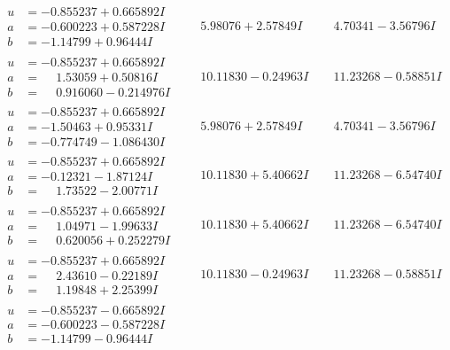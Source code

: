 \documentclass[1p]{elsarticle_modified}
\theoremstyle{definition}
\begin{document}
$$\begin{array}{c|c|c}
\begin{aligned}
u &= -0.855237 + 0.665892 I \\
a &= -0.600223 + 0.587228 I \\
b &= -1.14799 + 0.96444 I\end{aligned}
 & \phantom{-}5.98076 + 2.57849 I & \phantom{-}4.70341 - 3.56796 I \\ \hline\begin{aligned}
u &= -0.855237 + 0.665892 I \\
a &= \phantom{-}1.53059 + 0.50816 I \\
b &= \phantom{-}0.916060 - 0.214976 I\end{aligned}
 & \phantom{-}10.11830 - 0.24963 I & \phantom{-}11.23268 - 0.58851 I \\ \hline\begin{aligned}
u &= -0.855237 + 0.665892 I \\
a &= -1.50463 + 0.95331 I \\
b &= -0.774749 - 1.086430 I\end{aligned}
 & \phantom{-}5.98076 + 2.57849 I & \phantom{-}4.70341 - 3.56796 I \\ \hline\begin{aligned}
u &= -0.855237 + 0.665892 I \\
a &= -0.12321 - 1.87124 I \\
b &= \phantom{-}1.73522 - 2.00771 I\end{aligned}
 & \phantom{-}10.11830 + 5.40662 I & \phantom{-}11.23268 - 6.54740 I \\ \hline\begin{aligned}
u &= -0.855237 + 0.665892 I \\
a &= \phantom{-}1.04971 - 1.99633 I \\
b &= \phantom{-}0.620056 + 0.252279 I\end{aligned}
 & \phantom{-}10.11830 + 5.40662 I & \phantom{-}11.23268 - 6.54740 I \\ \hline\begin{aligned}
u &= -0.855237 + 0.665892 I \\
a &= \phantom{-}2.43610 - 0.22189 I \\
b &= \phantom{-}1.19848 + 2.25399 I\end{aligned}
 & \phantom{-}10.11830 - 0.24963 I & \phantom{-}11.23268 - 0.58851 I \\ \hline\begin{aligned}
u &= -0.855237 - 0.665892 I \\
a &= -0.600223 - 0.587228 I \\
b &= -1.14799 - 0.96444 I\end{aligned}

\end{array}$$
\end{document}
